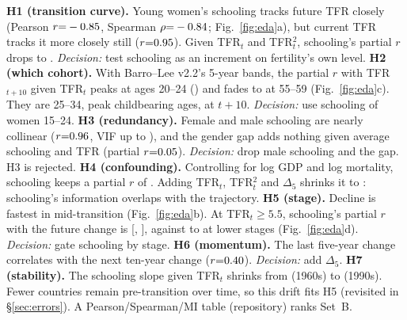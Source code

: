\documentclass[11pt]{article}
\begin{document}
\textbf{H1 (transition curve).} Young women's schooling tracks future TFR closely (Pearson $r{=}-0.85$, Spearman $\rho{=}-0.84$; Fig.~\ref{fig:eda}a), but current TFR tracks it more closely still ($r{=}0.95$). Given TFR$_t$ and TFR$_t^2$, schooling's partial $r$ drops to \partialEduTfr. \emph{Decision:} test schooling as an increment on fertility's own level.
\textbf{H2 (which cohort).} With Barro--Lee v2.2's 5-year bands, the partial $r$ with TFR$_{t+10}$ given TFR$_t$ peaks at ages 20--24 (\lagYoung) and fades to \lagOld{} at 55--59 (Fig.~\ref{fig:eda}c). They are 25--34, peak childbearing ages, at $t{+}10$. \emph{Decision:} use schooling of women 15--24.
\textbf{H3 (redundancy).} Female and male schooling are nearly collinear ($r{=}0.96$, VIF up to \vifEduMax), and the gender gap adds nothing given average schooling and TFR (partial $r{=}0.05$). \emph{Decision:} drop male schooling and the gap. H3 is rejected.
\textbf{H4 (confounding).} Controlling for log GDP and log mortality, schooling keeps a partial $r$ of \partialEduGdpQ. Adding TFR$_t$, TFR$_t^2$ and $\Delta_5$ shrinks it to \partialEduAll: schooling's information overlaps with the trajectory.
\textbf{H5 (stage).} Decline is fastest in mid-transition (Fig.~\ref{fig:eda}b). At TFR$_t\geq5.5$, schooling's partial $r$ with the future change is \stagePreR{} [\stagePreLo, \stagePreHi], against \stageMidR{} to \stageLowR{} at lower stages (Fig.~\ref{fig:eda}d). \emph{Decision:} gate schooling by stage.
\textbf{H6 (momentum).} The last five-year change correlates with the next ten-year change ($r{=}0.40$). \emph{Decision:} add $\Delta_5$.
\textbf{H7 (stability).} The schooling slope given TFR$_t$ shrinks from \slopeSixties{} (1960s) to \slopeNineties{} (1990s). Fewer countries remain pre-transition over time, so this drift fits H5 (revisited in \S\ref{sec:errors}). A Pearson/Spearman/MI table (repository) ranks Set~B.

\end{document}
